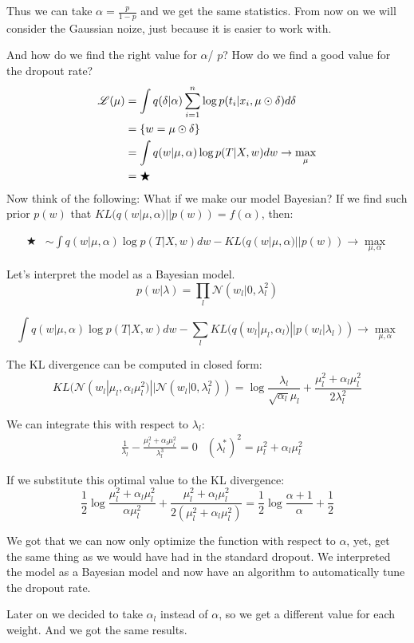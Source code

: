 Thus we can take $\alpha = \frac{p}{1 - p}$ and we get the same statistics. From now on we will consider the Gaussian noize, just because it is easier to work with.

And how do we find the right value for $\alpha$/ $p$? How do we find a good value for the dropout rate?
\begin{align*}
    \operatorname{\mathscr{L}} (\mu) &= \int q(\delta | \alpha) \sum_{i = 1}^n \log p(t_i | x_i, \mu \odot \delta) d \delta \\ 
    &= \{ w = \mu \odot \delta \} \\
    &= \int q(w | \mu, \alpha) \log p(T | X, w) d w \to \max_{\mu} \\ 
    &= \bigstar  
\end{align*}
Now think of the following: What if we make our model Bayesian? If we find such prior $p(w)$ that $KL(q(w | \mu, \alpha) || p(w)) = f(\alpha)$, then: 

\begin{align*}
    \bigstar &\sim \int q(w | \mu, \alpha) \log p(T | X, w) d w - KL(q(w | \mu, \alpha) || p(w)) \to \max_{\mu, \alpha} 
\end{align*}

Let's interpret the model as a Bayesian model. 
\[ 
    p(w | \lambda) = \prod_{l} \mathcal{N} (w_l | 0, \lambda_l^{2})
\] 

\[ 
    \int q(w | \mu, \alpha) \log p(T | X, w) d w - \sum_l KL (q(w_l | \mu_l, \alpha_l) || p(w_l | \lambda_l)) \to \max_{\mu, \alpha}
\] 

The KL divergence can be computed in closed form:
\[ 
    KL(\mathcal{N} (w_l | \mu_l, \alpha_l \mu_l^2) || \mathcal{N} (w_l | 0, \lambda_l^2)) = \log \frac{\lambda_l}{\sqrt{\alpha_l} \mu_l} + \frac{\mu_l^2 + \alpha_l \mu_l^2}{2 \lambda_l^2} 
\]

We can integrate this with respect to $\lambda_l$: 
\begin{align*}
    &\frac{1}{\lambda_l} - \frac{\mu_l^2 + \alpha_l \mu_l^2}{\lambda_l^3} = 0 
    &(\lambda_l^*)^2 = \mu_l^2 + \alpha_l \mu_l^2
\end{align*}

If we substitute this optimal value to the KL divergence: 
\[
    \frac{1}{2} \log \frac{\mu_l^2 + \alpha_l \mu_l^2}{\alpha \mu_l^2} + \frac{\mu_l^2 + \alpha_l \mu_l^2}{2 (\mu_l^2 + \alpha_l \mu_l^2)} = \frac{1}{2} \log \frac{\alpha + 1}{\alpha} + \frac{1}{2}
\] 

We got that we can now only optimize the function with respect to $\alpha$, yet, get the same thing as we would have had in the standard dropout. We interpreted the model as a Bayesian model and now have an algorithm to automatically tune the dropout rate.

Later on we decided to take $\alpha_l$ instead of $\alpha$, so we get a different value for each weight. And we got the same results. 

